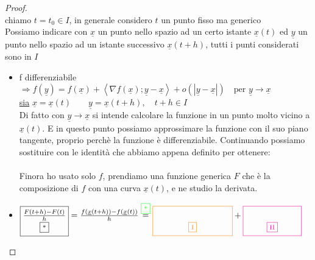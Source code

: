 \documentclass[a4paper, oneside]{article}
\begin{document}
        \begin{proof}
            \hfil\\
            chiamo $t = t_0 \in I$, in generale considero $t$ un punto fisso ma generico\\
            Possiamo indicare con $\underline{x}$ un punto nello spazio ad un certo istante $\underline{x}(t)$ ed $\underline{y}$ un punto nello spazio ad un istante successivo $\underline{x}(t+h)$, tutti i punti considerati sono in $I$\\
            \begin{itemize}
                \item f differenziabile $\Rightarrow f(\underline{y}) = f(\underline{x}) + \left\langle \nabla f (\underline{x}); \underline{y}- \underline{x} \right\rangle + o(\left\lvert \underline{y} - \underline{x} \right\rvert) \quad \text{per } \underline{y} \to \underline{x}$\\
                \underline{sia} $\underline{x} = \underline{x}(t) \qquad \underline{y} = \underline{x}(t+h), \quad t+h \in I$\\
                Di fatto con $\underline{y} \to \underline{x}$ si intende calcolare la funzione in un punto molto vicino a $\underline{x}(t)$. E in questo punto possiamo approssimare la funzione con il suo piano tangente, proprio perchè la funzione è differenziabile. Continuando possiamo sostituire
                con le identità che abbiamo appena definito per ottenere:\\
                \textcolor{green}{}  \textcolor{green}{\fbox{*}}\\
                Finora ho usato solo $f$, prendiamo una funzione generica $F$ che è la composizione di $f$ con una curva $\underline{x}(t)$, e ne studio la derivata.\\
                \item $\text{\fbox{$\underset{\text{\fbox{*}}}{\frac{F(t+h)-F(t)}{h}}$}} = \frac{f(\underline{x}(t+h))-f(\underline{x}(t))}{h} \overset{\text{\textcolor{green}{\fbox{*}}}}{=} \textcolor{orange}{\text{\fbox{\textcolor{white}{$\underset{\textcolor{orange}{\text{\fbox{I}}}}{\frac{\left\langle \nabla f(\underline{x}(t));\underline{x}(t+h) - \underline{x}(t)\right\rangle }{h}}$}}}} + \textcolor{magenta}{\text{\fbox{$\textcolor{white}{\underset{\text{\textcolor{magenta}{\fbox{II}}}}{\frac{o(\left\lvert \underline{x}(t+h) -\underline{x}(t)\right\rvert )}{h}}}$}}}$ \\

\end{itemize}
\end{proof}
\end{document}
